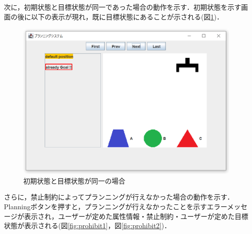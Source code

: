 \documentclass[12pt]{jarticle}
\begin{document}
\clearpage
次に，初期状態と目標状態が同一であった場合の動作を示す．初期状態を示す画面の後に以下の表示が現れ，既に目標状態にあることが示される(図\ref{fig:page17})．
\begin{figure}[htbp]
  \begin{center}
    \includegraphics[scale=0.6]{images/page17.PNG}
    \caption{初期状態と目標状態が同一の場合}
    \label{fig:page17}
  \end{center}
\end{figure}

さらに，禁止制約によってプランニングが行えなかった場合の動作を示す．Planningボタンを押すと，プランニングが行えなかったことを示すエラーメッセージが表示され，ユーザーが定めた属性情報・禁止制約・ユーザーが定めた目標状態が表示される(図\ref{fig:prohibit1}，図\ref{fig:prohibit2})．\\
\end{document}
